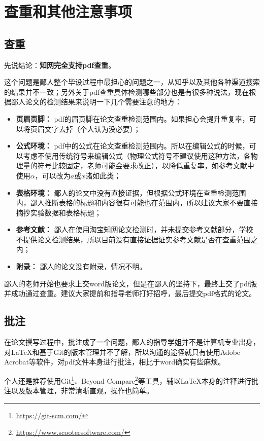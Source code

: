 \chapter{查重和其他注意事项}
\section{查重}

先说结论：{\large\textbf{知网完全支持pdf查重}}。

这个问题是鄙人整个毕设过程中最担心的问题之一，从知乎以及其他各种渠道搜索的结果并不一致；另外关于pdf查重具体检测哪些部分也是有很多种说法，现在根据鄙人论文的检测结果来说明一下几个需要注意的地方：

\begin{itemize}
  \item \textbf{页眉页脚：} pdf的眉页脚在论文查重检测范围内。如果担心会提升重复率，可以将页眉文字去掉（个人认为没必要）；
  \item \textbf{公式环境：} pdf中的公式在论文查重检测范围内。所以在编辑公式的时候，可以考虑不使用传统符号来编辑公式（物理公式符号不建议使用这种方法，各物理量的符号比较固定，老师可能会要求改正），以降低重复率，如参考文献中使用$\alpha$，可以改为$a$或$x$诸如此类；
  \item \textbf{表格环境：} 鄙人的论文中没有直接证据，但根据公式环境在查重检测范围内，鄙人推断表格的标题和内容很有可能也在范围内，所以建议大家不要直接摘抄实验数据和表格标题；
  \item \textbf{参考文献：} 鄙人在使用淘宝知网论文检测时，并未提交参考文献部分，学校不提供论文检测结果，所以目前没有直接证据证实参考文献是否在查重范围之内；
  \item \textbf{附录：} 鄙人的论文没有附录，情况不明。
\end{itemize}

鄙人的老师开始也要求上交word版论文，但是在鄙人的坚持下，最终上交了pdf版并成功通过查重。建议大家提前和指导老师打好招呼，最后提交pdf格式的论文。

\section{批注}
在论文撰写过程中，批注成了一个问题，鄙人的指导学姐并不是计算机专业出身，对\LaTeX 和基于Git的版本管理并不了解，所以沟通的途径就只有使用Adobe Acrobat等软件，对pdf文件本身进行批注，相比于word确实有些麻烦。

个人还是推荐使用Git\footnote{\url{https://git-scm.com/}}、Beyond Compare\footnote{\url{https://www.scootersoftware.com/}}等工具，辅以\LaTeX 本身的注释进行批注以及版本管理，非常清晰直观，操作也简单。

